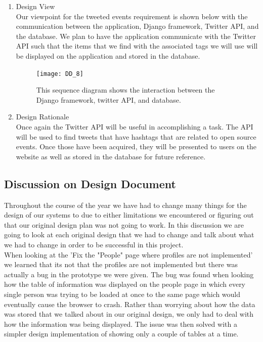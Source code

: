 \documentclass[draftclsnofoot,10pt,onecolumn]{IEEEtran} %
\begin{document}
\begin{enumerate}
\begin{enumerate}
				\item Design View \\ %
				Our viewpoint for the tweeted events requirement is shown below with the communication between the
				application, Django framework, Twitter API, and the database. We plan to have the application
				communicate with the Twitter
				API such that the items that we find with the associated tags we will use will be displayed on the
				application and stored in the database. \\
				
				\begin{figure}[H]
  					\begin{center}
						\texttt{[image: DD\_8]}
						\captionsetup{width=.4\linewidth}
						\centering
  						\caption{This sequence diagram shows the interaction between the Django framework, twitter API, 
  						and database.}
  					\end{center}
				\end{figure}
				
				\item Design Rationale \\
				Once again the Twitter API will be useful in accomplishing a task. The API will be used to find tweets that
				have hashtags that are related to open source events. Once those have been acquired, they will be presented
				to users on the website as well as stored in the database for future reference. \\
			\end{enumerate}
	\end{enumerate}

\subsection{Discussion on Design Document}
Throughout the course of the year we have had to change many things for the design of our systems to due to either limitations we encountered or figuring out that our original design plan was not going to work. In this discussion we are going to look at each original design that we had to change and talk about what we had to change in order to be successful in this project.\\

When looking at the 'Fix the "People" page where profiles are not implemented' we learned that its not that the profiles are not implemented but there was actually a bug in the prototype we were given. The bug was found when looking how the table of information was displayed on the people page in which every single person was trying to be loaded at once to the same page which would eventually cause the browser to crash. Rather than worrying about how the data was stored that we talked about in our original design, we only had to deal with how the information was being displayed. The issue was then solved with a simpler design implementation of showing only a couple of tables at a time. \\
\end{document}
